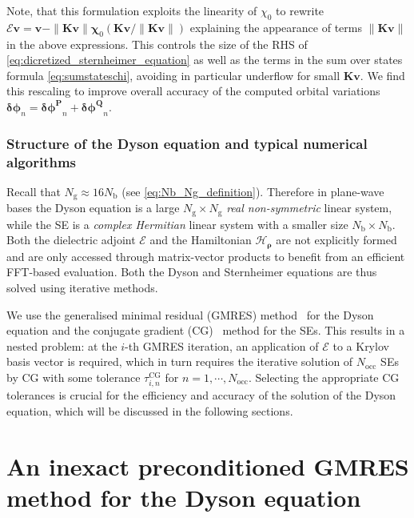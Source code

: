 \documentclass[hidelinks,onefignum,onetabnum]{siamart250211}
\newcommand{\Nocc}{N_{\mathrm{occ}}}
\newcommand{\Nb}{N_{\mathrm{b}}}
\newcommand{\Ng}{N_{\mathrm{g}}}
\newcommand{\taucg}{\tau^{\mathrm{CG}}}
\newcommand{\HrhoB}{\bm{\mathcal{H}}_{\bm \rho}}
\begin{document}
Note, that this formulation exploits the linearity of $\chi_0$ to rewrite
$\bm{\mathcal E} \bm v
= \bm v - \|\bm K \bm v\| \bm \chi_0 \left( \bm K \bm v / \|\bm K \bm v\| \right)$
explaining the appearance of terms $\|\bm K \bm v\|$ in the above expressions.
This controls the size of the
RHS of \eqref{eq:dicretized_sternheimer_equation}
as well as the terms
in the sum over states formula \eqref{eq:sumstateschi},
avoiding in particular underflow for small $\bm K \bm v$.
We find this rescaling to improve overall
accuracy of the computed orbital variations
$\bm{\delta \phi}_n = \bm{\delta \phi^P}_n + \bm{\delta \phi^Q}_n$.
%
%
%

\subsubsection{Structure of the Dyson equation and typical numerical algorithms}\label{sec:structure_dyson}
Recall that $\Ng \approx 16 \Nb$ (see \eqref{eq:Nb_Ng_definition}). Therefore
in plane-wave bases the Dyson equation is a large $\Ng \times \Ng$
\emph{real non-symmetric} linear system,
while the SE is a \emph{complex Hermitian} linear system
with a smaller size $\Nb \times \Nb$.
Both the dielectric adjoint $\bm{\mathcal{E}}$ and the Hamiltonian
$\HrhoB$ are not explicitly formed
and are only accessed through matrix-vector products
to benefit from an efficient FFT-based evaluation.
Both the Dyson and Sternheimer equations are thus solved using iterative methods.

We use the generalised minimal residual (GMRES) method~\cite{saad1986gmres} for
the Dyson equation and the conjugate gradient (CG)~\cite{hestenes1952cg} method
for the SEs.
This results in a nested problem:
at the $i$-th GMRES iteration, an application of $\bm{\mathcal{E}}$ to a Krylov
basis vector is required, which in turn requires the iterative solution
of $\Nocc$ SEs by CG with some tolerance $\taucg_{i,n}$
for $n = 1,\cdots, \Nocc$.
%
Selecting the appropriate CG tolerances is crucial for the efficiency
and accuracy of the solution of the Dyson equation, which will be discussed
in the following sections.

\section{An inexact preconditioned GMRES method for the Dyson equation}
\label{sec:theory}
\end{document}
